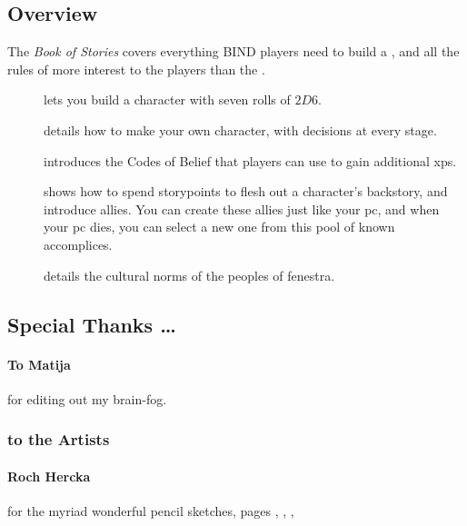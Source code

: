 \begin{multicols}{2}

\subsection*{Overview}

The \textit{Book of Stories} covers everything BIND players need to build a , and all the rules of more interest to the players than the .

\begin{description}
  \item[]
  lets you build a character with seven rolls of $2D6$.
  \item[]
  details how to make your own character, with decisions at every stage.
  \item[] introduces the Codes of Belief that players can use to gain additional \glspl{xp}.
  \item[] shows how to spend \glspl{storypoint} to flesh out a character's backstory, and introduce allies.
  You can create these allies just like your \gls{pc}, and when your \gls{pc} dies, you can select a new one from this pool of known accomplices.
  \item[] details the cultural norms of the peoples of \gls{fenestra}.
\end{description}

\columnbreak

\subsection*{Special Thanks \ldots}

\paragraph{To Matija}
for editing out my brain-fog.

\subsubsection*{to the Artists}

\paragraph{Roch Hercka} for the myriad wonderful pencil sketches, pages 
\pageref{Roch_Hercka/five_races}, 
\pageref{Roch_Hercka/xp-1}, 
\pageref{Roch_Hercka/xp-2}, 


\end{multicols}
